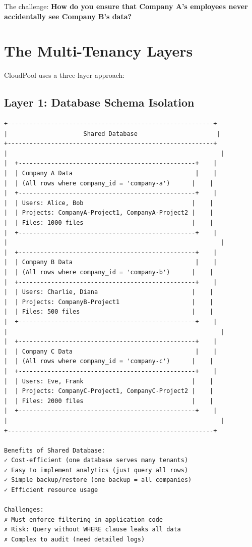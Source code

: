 \documentclass[11pt,a4paper]{report}
\begin{document}
The challenge: \textbf{How do you ensure that Company A's employees never accidentally see Company B's data?}


\chapter{The Multi-Tenancy Layers}


CloudPool uses a three-layer approach:


\section{Layer 1: Database Schema Isolation}


\begin{lstlisting}[language=text]
+---------------------------------------------------------+
|                     Shared Database                      |
+---------------------------------------------------------+
|                                                           |
|  +-------------------------------------------------+    |
|  | Company A Data                                  |    |
|  | (All rows where company_id = 'company-a')      |    |
|  +-------------------------------------------------+    |
|  | Users: Alice, Bob                              |    |
|  | Projects: CompanyA-Project1, CompanyA-Project2 |    |
|  | Files: 1000 files                              |    |
|  +-------------------------------------------------+    |
|                                                           |
|  +-------------------------------------------------+    |
|  | Company B Data                                  |    |
|  | (All rows where company_id = 'company-b')      |    |
|  +-------------------------------------------------+    |
|  | Users: Charlie, Diana                          |    |
|  | Projects: CompanyB-Project1                    |    |
|  | Files: 500 files                               |    |
|  +-------------------------------------------------+    |
|                                                           |
|  +-------------------------------------------------+    |
|  | Company C Data                                  |    |
|  | (All rows where company_id = 'company-c')      |    |
|  +-------------------------------------------------+    |
|  | Users: Eve, Frank                              |    |
|  | Projects: CompanyC-Project1, CompanyC-Project2 |    |
|  | Files: 2000 files                              |    |
|  +-------------------------------------------------+    |
|                                                           |
+---------------------------------------------------------+

Benefits of Shared Database:
✓ Cost-efficient (one database serves many tenants)
✓ Easy to implement analytics (just query all rows)
✓ Simple backup/restore (one backup = all companies)
✓ Efficient resource usage

Challenges:
✗ Must enforce filtering in application code
✗ Risk: Query without WHERE clause leaks all data
✗ Complex to audit (need detailed logs)
\end{lstlisting}
\end{document}
